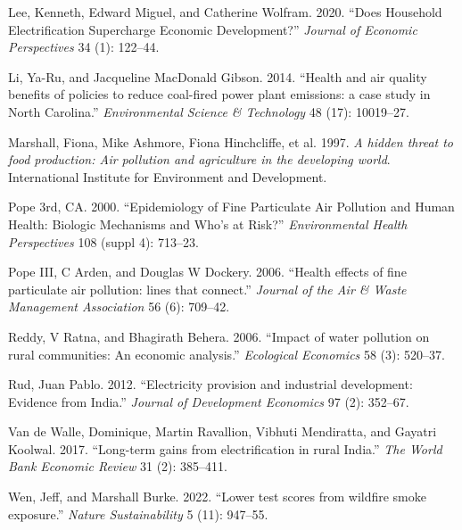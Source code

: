 \documentclass[
]{article}
\newlength{\cslhangindent}
\newlength{\cslentryspacingunit} %
\newenvironment{CSLReferences}[2] %
 {%
  \setlength{\parindent}{0pt}
  \ifodd #1
  \let\oldpar\par
  \def\par{\hangindent=\cslhangindent\oldpar}
  \fi
  \setlength{\parskip}{#2\cslentryspacingunit}
 }%
 {}
\begin{document}
\begin{CSLReferences}{1}{0}
\leavevmode{}%
Lee, Kenneth, Edward Miguel, and Catherine Wolfram. 2020. {``Does Household Electrification Supercharge Economic Development?''} \emph{{Journal of Economic Perspectives}} 34 (1): 122--44.

\leavevmode{}%
Li, Ya-Ru, and Jacqueline MacDonald Gibson. 2014. {``{Health and air quality benefits of policies to reduce coal-fired power plant emissions: a case study in North Carolina}.''} \emph{{Environmental Science \& Technology}} 48 (17): 10019--27.

\leavevmode{}%
Marshall, Fiona, Mike Ashmore, Fiona Hinchcliffe, et al. 1997. \emph{{A hidden threat to food production: Air pollution and agriculture in the developing world}}. {International Institute for Environment and Development.}

\leavevmode{}%
Pope 3rd, CA. 2000. {``Epidemiology of Fine Particulate Air Pollution and Human Health: Biologic Mechanisms and Who's at Risk?''} \emph{{Environmental Health Perspectives}} 108 (suppl 4): 713--23.

\leavevmode{}%
Pope III, C Arden, and Douglas W Dockery. 2006. {``{Health effects of fine particulate air pollution: lines that connect}.''} \emph{{Journal of the Air \& Waste Management Association}} 56 (6): 709--42.

\leavevmode{}%
Reddy, V Ratna, and Bhagirath Behera. 2006. {``{Impact of water pollution on rural communities: An economic analysis}.''} \emph{{Ecological Economics}} 58 (3): 520--37.

\leavevmode{}%
Rud, Juan Pablo. 2012. {``{Electricity provision and industrial development: Evidence from India}.''} \emph{{Journal of Development Economics}} 97 (2): 352--67.

\leavevmode{}%
Van de Walle, Dominique, Martin Ravallion, Vibhuti Mendiratta, and Gayatri Koolwal. 2017. {``{Long-term gains from electrification in rural India}.''} \emph{{The World Bank Economic Review}} 31 (2): 385--411.

\leavevmode{}%
Wen, Jeff, and Marshall Burke. 2022. {``{Lower test scores from wildfire smoke exposure}.''} \emph{{Nature Sustainability}} 5 (11): 947--55.

\end{CSLReferences}
\end{document}
